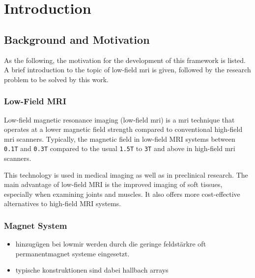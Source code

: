 \hypertarget{introduction}{%
\chapter{Introduction}\label{introduction}}

\hypertarget{background-and-motivation}{%
\section{Background and Motivation}\label{background-and-motivation}}

As the following, the motivation for the development of this framework
is listed. A brief introduction to the topic of low-field \gls{mri} is
given, followed by the research problem to be solved by this work.

\hypertarget{low-field-mri}{%
\subsection{Low-Field MRI}\label{low-field-mri}}

Low-field magnetic resonance imaging (low-field \gls{mri}) is a
\gls{mri} technique that operates at a lower magnetic field strength
compared to conventional high-field \gls{mri} scanners. Typically, the
magnetic field in low-field MRI systems between
\passthrough{\lstinline!0.1T!} and \passthrough{\lstinline!0.3T!}
compared to the usual \passthrough{\lstinline!1.5T!} to
\passthrough{\lstinline!3T!} and above in high-field \gls{mri}
scanners.\cite{Hori2021-pt}

This technology is used in medical imaging as well as in preclinical
research. The main advantage of low-field MRI is the improved imaging of
soft tissues, especially when examining joints and muscles. It also
offers more cost-effective alternatives to high-field MRI
systems.\cite{Hori2021-pt}

\hypertarget{magnet-system}{%
\subsection{Magnet System}\label{magnet-system}}

\begin{itemize}
\tightlist
\item
  hinzugügen bei lowmir werden durch die geringe feldstärkre oft
  permanentmagnet systeme eingesetzt.
\item
  typische konstruktionen sind dabei hallbach arrays
\end{itemize}

